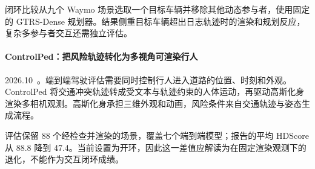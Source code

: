 闭环比较从九个 Waymo 场景选取一个目标车辆并移除其他动态参与者，使用固定的 GTRS-Dense 规划器。结果侧重目标车辆超出日志轨迹时的渲染和规划反应，复杂多参与者交互还需独立评估。

\paragraph{ControlPed：把风险轨迹转化为多视角可渲染行人}
2026.10~\cite{2610_06171}。端到端驾驶评估需要同时控制行人进入道路的位置、时刻和外观。ControlPed 将交通冲突轨迹转成受文本与轨迹约束的人体运动，再驱动高斯化身渲染多相机观测。高斯化身承担三维外观和动画，风险条件来自交通轨迹与姿态生成流程。

评估保留 88 个经检查并渲染的场景，覆盖七个端到端模型；报告的平均 HDScore 从 88.8 降到 47.4。当前设置为开环，因此这一差值应解读为在固定渲染观测下的退化，不能作为交互闭环成绩。
